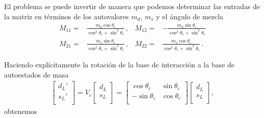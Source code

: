 El problema se puede invertir de manera que podemos determinar las entradas de la matriz en términos de los autovalores $m_{d}$, $m_s$ y el ángulo de mezcla
\begin{align}
  M_{11}=&\frac{m_d\cos\theta_c}{\cos^2\theta_c+\sin^2\theta_c}\,,&
   M_{12}=&-\frac{m_d\sin\theta_c}{\cos^2\theta_c+\sin^2\theta_c} \nonumber\\
  M_{21}=&\frac{m_s\sin\theta_c }{\cos^2\theta_c+\sin^2\theta_c}\,,&
   M_{22}=&\frac{m_s\cos\theta_c }{\cos^2\theta_c+\sin^2\theta_c} \,.
\end{align}

Haciendo explícitamente la rotación de la base de interacción a la base de autoestados de masa
\begin{align}
  \begin{bmatrix}
    d_L'\\
    s_L'\\
  \end{bmatrix}= V_c
  \begin{bmatrix}
    d_L\\
    s_L\\
  \end{bmatrix}=\begin{bmatrix}
    \cos\theta_c & \sin\theta_c\\
    - \sin\theta_c & \cos\theta_c  \\
  \end{bmatrix}  \begin{bmatrix}
    d_L\\
    s_L\\
  \end{bmatrix},
\end{align}
obtenemos
